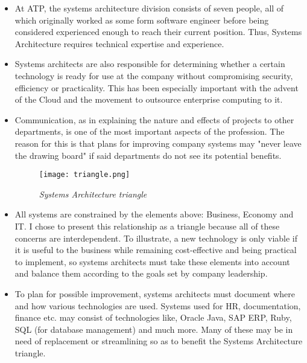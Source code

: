 \begin{itemize}
    \item At ATP, the systems architecture division consists of seven people,
          all of which originally worked as some form software engineer before
          being considered experienced enough to reach their current position.
          Thus, Systems Architecture requires technical expertise and
          experience.
    \item Systems architects are also responsible for determining whether a
          certain technology is ready for use at the company without
          compromising security, efficiency or practicality. This has been
          especially important with the advent of the Cloud and the movement to
          outsource enterprise computing to it.
    \item Communication, as in explaining the nature and effects of projects to
          other departments, is one of the most important aspects of the
          profession. The reason for this is that plans for improving company
          systems may "never leave the drawing board" if said departments do not
          see its potential benefits.

    \begin{figure}[H]
        \centering
            \texttt{[image: triangle.png]}
            \caption*{\textit{Systems Architecture triangle}}
    \end{figure}

    \item All systems are constrained by the elements above: Business, Economy
          and IT. I chose to present this relationship as a triangle because all
          of these concerns are interdependent. To illustrate, a new technology
          is only viable if it is useful to the business while remaining
          cost-effective and being practical to implement, so systems architects
          must take these elements into account and balance them according to
          the goals set by company leadership.
    \item To plan for possible improvement, systems architects must document
          where and how various technologies are used. Systems used for HR,
          documentation, finance etc. may consist of technologies like, Oracle
          Java, SAP ERP, Ruby, SQL (for database management) and much more. Many
          of these may be in need of replacement or streamlining so as to
          benefit the Systems Architecture triangle.
\end{itemize}

